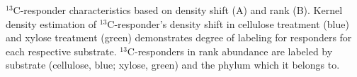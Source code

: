 $^{13}$C-responder characteristics based on density shift (A) and rank (B).
Kernel density estimation of $^{13}$C-responder's density shift in cellulose
treatment (blue) and xylose treatment (green) demonstrates degree of labeling
for responders for each respective substrate. $^{13}$C-responders in rank
abundance are labeled by substrate (cellulose, blue; xylose, green) and the
phylum which it belongs to.  

